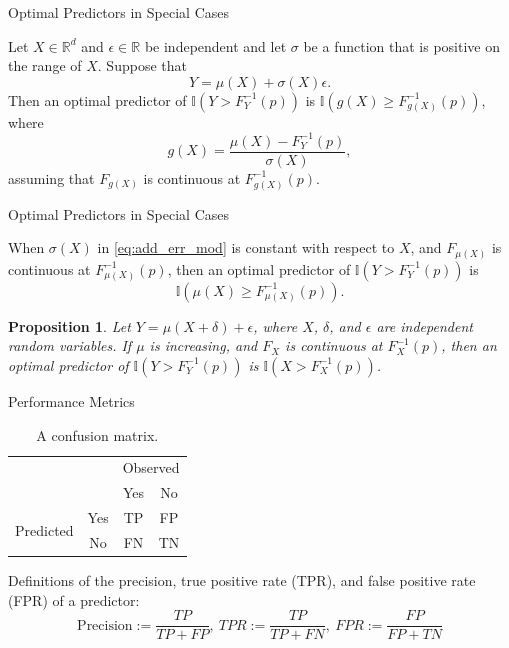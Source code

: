 \documentclass{beamer}
\newtheorem{proposition}{Proposition}
\def\I{\mathbb I}
\def\R{\mathbb R}
\begin{document}
\begin{frame}{Optimal Predictors in Special Cases}
    \begin{theorem}
        Let $X \in \R^d$ and $\epsilon \in \R$ be independent and let $\sigma$ be a function that is positive on the range of $X$. Suppose that 
        \begin{equation}\label{eq:add_err_mod}
            Y = \mu(X) + \sigma(X)\epsilon.
        \end{equation}
        Then an optimal predictor of $\I(Y > F_Y^{-1}(p))$ is $\I(g(X) \ge F_{g(X)}^{-1}(p))$, where
        \[
        g(X) = \frac{\mu(X) - F_Y^{-1}(p)}{\sigma(X)},
        \]
        assuming that $F_{g(X)}$ is continuous at $F_{g(X)}^{-1}(p)$.
    \end{theorem}
\end{frame}

\begin{frame}{Optimal Predictors in Special Cases}
    \begin{corollary}
        When $\sigma(X)$ in \eqref{eq:add_err_mod} is constant with respect to $X$, and $F_{\mu(X)}$ is continuous at $F_{\mu(X)}^{-1}(p)$, then an optimal predictor of $\I(Y > F_Y^{-1}(p))$ is
        \[
        \I(\mu(X) \ge F_{\mu(X)}^{-1}(p)).
        \]
    \end{corollary}

    \begin{proposition}
        Let $Y = \mu(X + \delta) + \epsilon$, where $X$, $\delta$, and $\epsilon$ are independent random
        variables. If $\mu$ is increasing, and $F_X$ is continuous at $F_X^{-1}(p)$, then an optimal predictor of $\I(Y > F_Y^{-1}(p))$ is $\I(X > F_X^{-1}(p))$.
    \end{proposition}
\end{frame}

\begin{frame}{Performance Metrics}
    \begin{table}[h]
        \centering
        \begin{tabular}{@{}cc|cc@{}}
            \multicolumn{1}{c}{} &\multicolumn{1}{c}{} &\multicolumn{2}{c}{Observed} \\ 
            \multicolumn{1}{c}{} & 
            \multicolumn{1}{c|}{} & 
            \multicolumn{1}{c}{Yes} & 
            \multicolumn{1}{c}{No} \\ 
            \cline{2-4}
            \multirow[c]{2}{*}{Predicted}
            & Yes  & TP & FP   \\[1.5ex]
            & No  & FN   & TN \\ 
            \cline{2-4}
        \end{tabular}
        \caption{A confusion matrix.}
        \label{tab:conf_mat}
    \end{table}
    Definitions of the precision, true positive rate (TPR), and false positive rate (FPR) of a predictor:
    \[
    \text{Precision} := \frac{TP}{TP + FP}, \
    TPR := \frac{TP}{TP + FN}, \
    FPR := \frac{FP}{FP + TN}
    \]
\end{frame}
\end{document}
